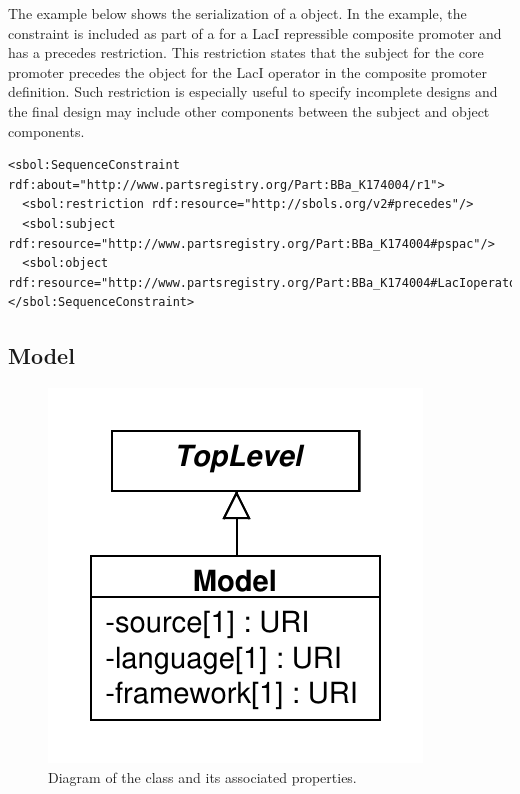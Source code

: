 The example below shows the serialization of a  object. In the example, the constraint is included as part of a  for a LacI repressible composite promoter and has a precedes restriction. This restriction states that the subject  for the core promoter precedes the object  for the LacI operator in the composite promoter definition. Such restriction is especially useful to specify incomplete designs and the final design may include other components between the subject and object components. 
\begin{lstlisting}
<sbol:SequenceConstraint rdf:about="http://www.partsregistry.org/Part:BBa_K174004/r1">
  <sbol:restriction rdf:resource="http://sbols.org/v2#precedes"/>
  <sbol:subject rdf:resource="http://www.partsregistry.org/Part:BBa_K174004#pspac"/>
  <sbol:object rdf:resource="http://www.partsregistry.org/Part:BBa_K174004#LacIoperator"/>
</sbol:SequenceConstraint>
\end{lstlisting}


\subsection{Model}
\label{sec:Model}

\begin{figure}[ht]
\begin{center}
\includegraphics[scale=0.6]{uml/model}
\caption[]{Diagram of the  class and its associated properties.}
\label{uml:model}
\end{center}
\end{figure}

